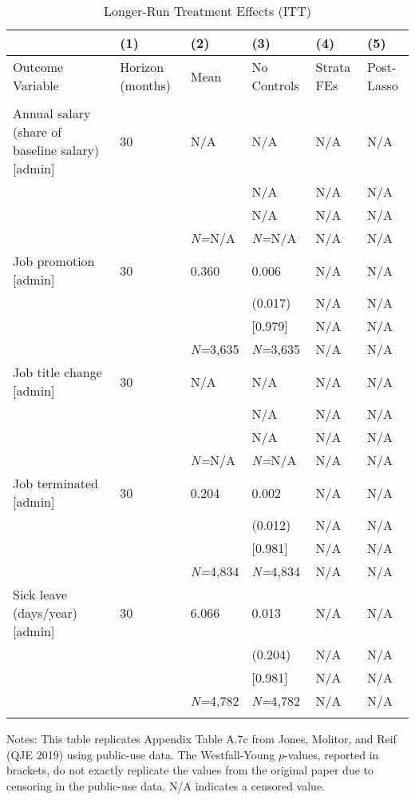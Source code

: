 \documentclass{article}
\begin{document}
\setlength{\tabcolsep}{6pt}
\begin{table}[tbp] \centering
{}

\caption{Longer-Run Treatment Effects (ITT)}
\label{tab:appendix_itt_job_vars_admin_0816_0119}
{\scriptsize
\begin{tabularx}{\linewidth}{lCCCCC}

\toprule
&{(1)}&{(2)}&{(3)}&{(4)}&{(5)} \tabularnewline \midrule
{Outcome Variable}&{Horizon (months)}&{Mean}&{No Controls}&{Strata FEs}&{Post-Lasso} \tabularnewline
\midrule 
\addlinespace[1.4ex]
& \tabularnewline
\midrule Annual salary (share of baseline salary) [admin]&30&N/A&N/A&N/A&N/A \tabularnewline
&&&N/A&N/A&N/A \tabularnewline
&&&N/A&N/A&N/A \tabularnewline
&&\textit{N=}N/A&\textit{N=}N/A&N/A&N/A \tabularnewline
\addlinespace[1.4ex]
Job promotion [admin]&30&0.360&0.006&N/A&N/A \tabularnewline
&&&(0.017)&N/A&N/A \tabularnewline
&&&[0.979]&N/A&N/A \tabularnewline
&&\textit{N=}3,635&\textit{N=}3,635&N/A&N/A \tabularnewline
\addlinespace[1.4ex]
Job title change [admin]&30&N/A&N/A&N/A&N/A \tabularnewline
&&&N/A&N/A&N/A \tabularnewline
&&&N/A&N/A&N/A \tabularnewline
&&\textit{N=}N/A&\textit{N=}N/A&N/A&N/A \tabularnewline
\addlinespace[1.4ex]
Job terminated [admin]&30&0.204&0.002&N/A&N/A \tabularnewline
&&&(0.012)&N/A&N/A \tabularnewline
&&&[0.981]&N/A&N/A \tabularnewline
&&\textit{N=}4,834&\textit{N=}4,834&N/A&N/A \tabularnewline
\addlinespace[1.4ex]
Sick leave (days/year) [admin]&30&6.066&0.013&N/A&N/A \tabularnewline
&&&(0.204)&N/A&N/A \tabularnewline
&&&[0.981]&N/A&N/A \tabularnewline
&&\textit{N=}4,782&\textit{N=}4,782&N/A&N/A \tabularnewline
\bottomrule\addlinespace[-1.5ex] 

\end{tabularx}
\begin{flushleft}
\footnotesize Notes: This table replicates Appendix Table A.7c from Jones, Molitor, and Reif (QJE 2019) using public-use data. The Westfall-Young \(p\)-values, reported in brackets, do not exactly replicate the values from the original paper due to censoring in the public-use data. N/A indicates a censored value.
\end{flushleft}
}
\end{table}
\end{document}
